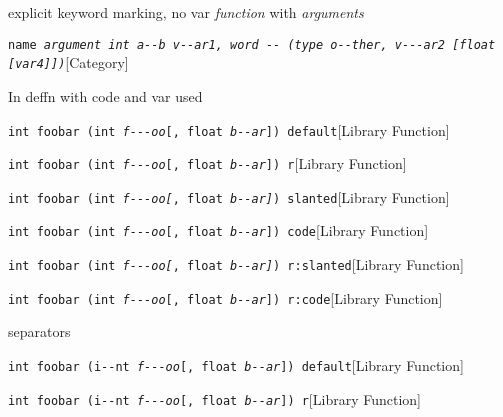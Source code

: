 \documentclass{book}
\begin{document}
%
explicit keyword marking, no var \textsl{function} with \textsl{arguments}

\noindent\texttt{name \EmbracOn{}\textsl{argument \EmbracOff{}\texttt{int}\EmbracOn{} \EmbracOff{}\texttt{a{-}{-}b}\EmbracOn{} \EmbracOff{}\textsl{v{-}{-}ar1}\EmbracOn{}, word \EmbracOff{}\texttt{{-}{-}}\EmbracOn{} (\EmbracOff{}\texttt{type o{-}{-}ther}\EmbracOn{}, \EmbracOff{}\textsl{v{-}{-}{-}ar2}\EmbracOn{}  [\EmbracOff{}\texttt{float}\EmbracOn{} [\EmbracOff{}\textsl{var4}\EmbracOn{}]])}}\hfill[Category]



%
In deffn with code and var used

\noindent\texttt{int foobar (int \textsl{f{-}{-}{-}oo}[, float \textsl{b{-}{-}ar}]) default}\hfill[Library Function]



%
\noindent\texttt{int foobar (int \textsl{f{-}{-}{-}oo}\textnormal{[}, float \textsl{b{-}{-}ar}\textnormal{]}) r}\hfill[Library Function]



%
\noindent\texttt{int foobar (int \textsl{f{-}{-}{-}oo}\textsl{[}, float \textsl{b{-}{-}ar}\textsl{]}) slanted}\hfill[Library Function]



%
\noindent\texttt{int foobar (int \textsl{f{-}{-}{-}oo}\texttt{[}, float \textsl{b{-}{-}ar}\texttt{]}) code}\hfill[Library Function]



%
\noindent\texttt{int foobar (int \textsl{f{-}{-}{-}oo}\textnormal{\textsl{[}}, float \textsl{b{-}{-}ar}\textnormal{\textsl{]}}) r:slanted}\hfill[Library Function]



%
\noindent\texttt{int foobar (int \textsl{f{-}{-}{-}oo}\textnormal{\texttt{[}}, float \textsl{b{-}{-}ar}\textnormal{\texttt{]}}) r:code}\hfill[Library Function]



%
separators

\noindent\texttt{int foobar (i{-}{-}nt \textsl{f{-}{-}{-}oo}[, float \textsl{b{-}{-}ar}]) default}\hfill[Library Function]



%
\noindent\texttt{int foobar (\textnormal{i{-}{-}nt} \textsl{f{-}{-}{-}oo}[, float \textsl{b{-}{-}ar}]) r}\hfill[Library Function]
\end{document}
